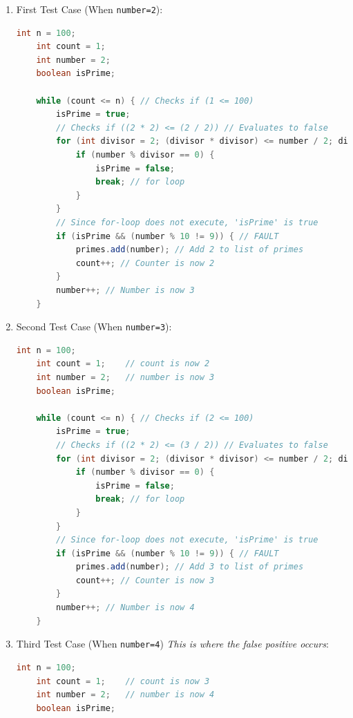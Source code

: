 \documentclass{article}
\begin{document}
\begin{enumerate}

    \item First Test Case (When \texttt{number=2}):

    \begin{lstlisting}[language=Java]
    int n = 100;
    int count = 1;
    int number = 2;
    boolean isPrime;

    while (count <= n) { // Checks if (1 <= 100)
        isPrime = true;
        // Checks if ((2 * 2) <= (2 / 2)) // Evaluates to false
        for (int divisor = 2; (divisor * divisor) <= number / 2; divisor++) {
            if (number % divisor == 0) {
                isPrime = false;
                break; // for loop
            }
        }
        // Since for-loop does not execute, 'isPrime' is true
        if (isPrime && (number % 10 != 9)) { // FAULT
            primes.add(number); // Add 2 to list of primes
            count++; // Counter is now 2
        }
        number++; // Number is now 3
    }
    \end{lstlisting}

    \item Second Test Case (When \texttt{number=3}):

    \begin{lstlisting}[language=Java]
    int n = 100;
    int count = 1;    // count is now 2
    int number = 2;   // number is now 3
    boolean isPrime;

    while (count <= n) { // Checks if (2 <= 100)
        isPrime = true;
        // Checks if ((2 * 2) <= (3 / 2)) // Evaluates to false
        for (int divisor = 2; (divisor * divisor) <= number / 2; divisor++) {
            if (number % divisor == 0) {
                isPrime = false;
                break; // for loop
            }
        }
        // Since for-loop does not execute, 'isPrime' is true
        if (isPrime && (number % 10 != 9)) { // FAULT
            primes.add(number); // Add 3 to list of primes
            count++; // Counter is now 3
        }
        number++; // Number is now 4
    }
    \end{lstlisting}

    \item Third Test Case (When \texttt{number=4})
    \textit{This is where the false positive occurs}:

    \begin{lstlisting}[language=Java]
    int n = 100;
    int count = 1;    // count is now 3
    int number = 2;   // number is now 4
    boolean isPrime;


\end{lstlisting}
\end{enumerate}
\end{document}

